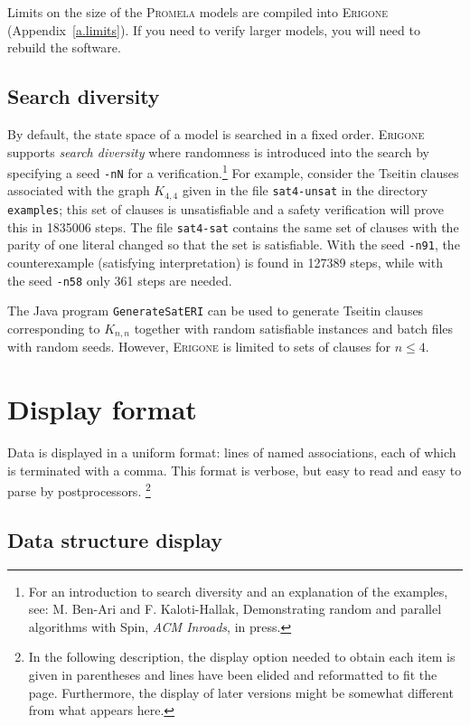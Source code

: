 \documentclass[11pt]{article}
\newcommand*{\prg}{\textsc{Erigone}}
\newcommand*{\prm}{\textsc{Promela}}
\newcommand*{\p}[1]{\texttt{#1}}
\begin{document}
Limits on the size of the \prm{} models are compiled into \prg{}
(Appendix~\ref{a.limits}). If you need to verify larger models, you will
need to rebuild the software.

\subsection{Search diversity}\label{s.search}

By default, the state space of a model is searched in a fixed order.
\prg{} supports \emph{search diversity} where randomness is introduced
into the search by specifying a seed \p{-nN} for a
verification.\footnote{For an introduction to search diversity and an
explanation of the examples, see: M. Ben-Ari and F. Kaloti-Hallak,
Demonstrating random and parallel algorithms with Spin, \textit{ACM
Inroads}, in press.} For example, consider the Tseitin clauses
associated with the graph $K_{4,4}$ given in the file \p{sat4-unsat} in
the directory \p{examples}; this set of clauses is unsatisfiable and a
safety verification will prove this in 1835006 steps. The file
\p{sat4-sat} contains the same set of clauses with the parity of one
literal changed so that the set is satisfiable. With the seed \p{-n91},
the counterexample (satisfying interpretation) is found in 127389 steps,
while with the seed \p{-n58} only 361 steps are needed.

The Java program \p{GenerateSatERI} can be used to generate Tseitin
clauses corresponding to $K_{n,n}$ together with random satisfiable
instances and batch files with random seeds. However, \prg{} is limited
to sets of clauses for $n\leq 4$.  

\newpage

\section{Display format}

Data is displayed in a uniform format: lines of named associations, each
of which is terminated with a comma. This format is verbose, but easy to
read and easy to parse by postprocessors. \footnote{In the following
description, the display option needed to obtain each item is given in
parentheses and lines have been elided and reformatted to fit the page.
Furthermore, the display of later versions might be somewhat different
from what appears here.}

\subsection{Data structure display}
\end{document}
